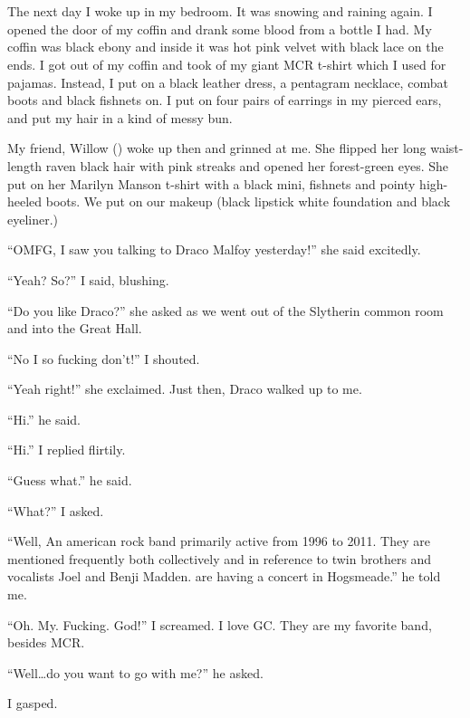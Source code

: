\section{}



The next day I woke up in my bedroom. It was snowing and raining again. I opened the door of my coffin and drank some blood from a bottle I had. My coffin was black ebony and inside it was hot pink velvet with black lace on the ends. I got out of my coffin and took of my giant MCR t-shirt which I used for pajamas. Instead, I put on a black leather dress, a pentagram necklace, combat boots and black fishnets on. I put on four pairs of earrings in my pierced ears, and put my hair in a kind of messy bun.

My friend, Willow () woke up then and grinned at me. She flipped her long waist-length raven black hair with pink streaks and opened her forest-green eyes. She put on her Marilyn Manson t-shirt with a black mini, fishnets and pointy high-heeled boots. We put on our makeup (black lipstick white foundation and black eyeliner.)

\enquote{OMFG, I saw you talking to Draco Malfoy yesterday!} she said excitedly.

\enquote{Yeah? So?} I said, blushing.

\enquote{Do you like Draco?} she asked as we went out of the Slytherin common room and into the Great Hall.

\enquote{No I so fucking don't!} I shouted.

\enquote{Yeah right!} she exclaimed. Just then, Draco walked up to me.

\enquote{Hi.} he said.

\enquote{Hi.} I replied flirtily.

\enquote{Guess what.} he said.

\enquote{What?} I asked.

\enquote{Well,
{An american rock band primarily active from 1996 to 2011.
They are mentioned frequently both collectively and
in reference to twin brothers and vocalists Joel and
Benji Madden.}
are having a concert in Hogsmeade.} he told me.

\enquote{Oh. My. Fucking. God!} I screamed. I love GC\@. They are my favorite band, besides MCR\@.

\enquote{Well\ldots do you want to go with me?} he asked.

I gasped.
